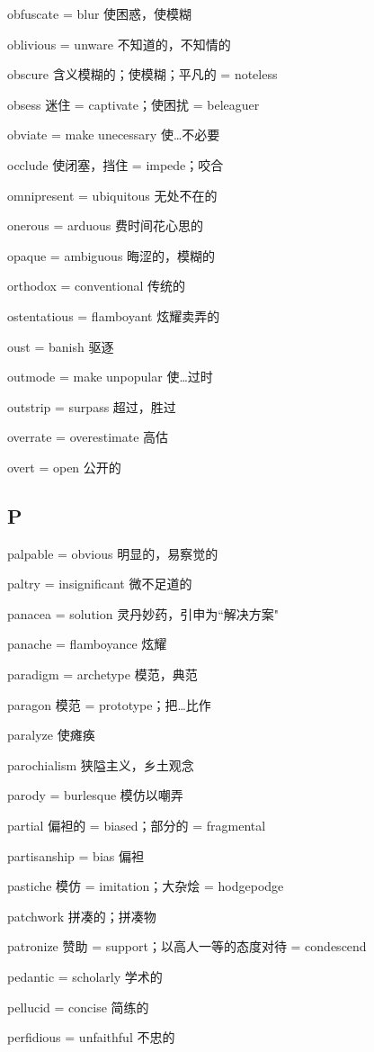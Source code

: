 \documentclass[UTF8, fontset = none, zihao = -4, linespread = 1.1]{ctexart}
\begin{document}
\begin{multicols}{2}
obfuscate = blur 使困惑，使模糊

oblivious = unware 不知道的，不知情的

obscure 含义模糊的；使模糊；平凡的 = noteless

obsess 迷住 = captivate；使困扰 = beleaguer

obviate = make unecessary 使…不必要

occlude 使闭塞，挡住 = impede；咬合

omnipresent = ubiquitous 无处不在的

onerous = arduous 费时间花心思的

opaque = ambiguous 晦涩的，模糊的

orthodox = conventional 传统的

ostentatious = flamboyant 炫耀卖弄的

oust = banish 驱逐

outmode = make unpopular 使…过时

outstrip = surpass 超过，胜过

overrate = overestimate 高估

overt = open 公开的

\subsection*{P}
palpable = obvious 明显的，易察觉的

paltry = insignificant 微不足道的

panacea = solution 灵丹妙药，引申为“解决方案"

panache = flamboyance 炫耀

paradigm = archetype 模范，典范

paragon 模范 = prototype；把…比作

paralyze 使瘫痪

parochialism 狭隘主义，乡土观念

parody = burlesque 模仿以嘲弄

partial 偏袒的 = biased；部分的 = fragmental

partisanship = bias 偏袒

pastiche 模仿 = imitation；大杂烩 = hodgepodge

patchwork 拼凑的；拼凑物

patronize 赞助 = support；以高人一等的态度对待 = condescend

pedantic = scholarly 学术的

pellucid = concise 简练的

perfidious = unfaithful 不忠的


\end{multicols}
\end{document}
